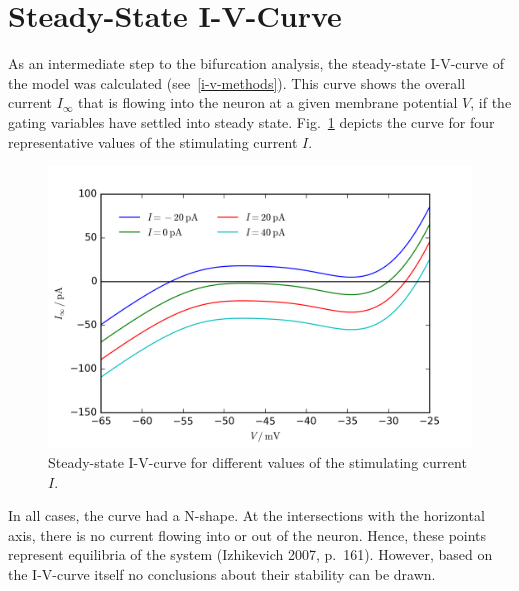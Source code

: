 \documentclass[12pt,a4paper,]{report}
\begin{document}
\section{Steady-State I-V-Curve}\label{i-v-results}

As an intermediate step to the bifurcation analysis, the steady-state
I-V-curve of the model was calculated (see~\ref{i-v-methods}). This
curve shows the overall current $I_{\infty}$ that is flowing into the
neuron at a given membrane potential $V$, if the gating variables have
settled into steady state. Fig.~\ref{i-v-curve} depicts the curve for
four representative values of the stimulating current $I$.

\begin{figure}
\centering
\includegraphics[]{images/I-V-curve.png}
\caption[Steady-state I-V-curve for different values of the
stimulating current $I$]{Steady-state I-V-curve for different values of the
stimulating current $I$.}\label{i-v-curve}
\end{figure}

In all cases, the curve had a N-shape. At the intersections with the
horizontal axis, there is no current flowing into or out of the neuron.
Hence, these points represent equilibria of the system (Izhikevich 2007,
p.~161). However, based on the I-V-curve itself no conclusions about
their stability can be drawn.
\end{document}
